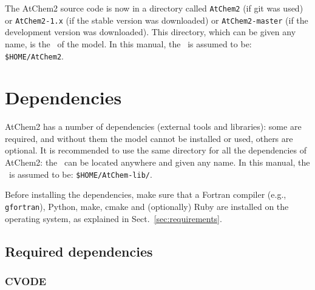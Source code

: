 The AtChem2 source code is now in a directory called \texttt{AtChem2}
(if git was used) or \texttt{AtChem2-1.x} (if the stable version was
downloaded) or \texttt{AtChem2-master} (if the development version was
downloaded). This directory, which can be given any name, is the
\maindir\ of the model. In this manual, the \maindir\ is assumed to
be: \texttt{\$HOME/AtChem2}.

\section{Dependencies} \label{sec:dependencies}

AtChem2 has a number of dependencies (external tools and libraries):
some are required, and without them the model cannot be installed or
used, others are optional. It is recommended to use the same directory
for all the dependencies of AtChem2: the \depdir\ can be located
anywhere and given any name. In this manual, the \depdir\ is
assumed to be: \texttt{\$HOME/AtChem-lib/}.

Before installing the dependencies, make sure that a Fortran compiler
(e.g., \texttt{gfortran}), Python, make, cmake and (optionally) Ruby
are installed on the operating system, as explained in
Sect.~\ref{sec:requirements}.

\subsection{Required dependencies} \label{subsec:required-dependencies}



\subsubsection{CVODE}

